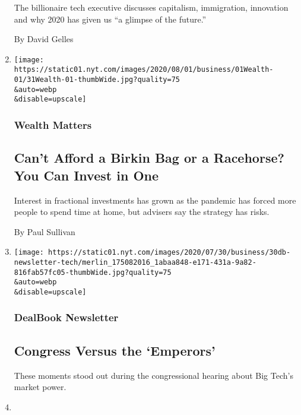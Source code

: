 \begin{enumerate}
  The billionaire tech executive discusses capitalism, immigration,
  innovation and why 2020 has given us ``a glimpse of the future.''

  By David Gelles
\item
  \href{/2020/07/31/your-money/birkin-bag-racehorse-invest.html}{}

  \texttt{[image: https://static01.nyt.com/images/2020/08/01/business/01Wealth-01/31Wealth-01-thumbWide.jpg?quality=75\\\&auto=webp\\\&disable=upscale]}

  \hypertarget{wealth-matters}{%
  \subsubsection{Wealth Matters}\label{wealth-matters}}

  \hypertarget{cant-afford-a-birkin-bag-or-a-racehorse-you-can-invest-in-one}{%
  \subsection{Can't Afford a Birkin Bag or a Racehorse? You Can Invest
  in
  One}\label{cant-afford-a-birkin-bag-or-a-racehorse-you-can-invest-in-one}}

  Interest in fractional investments has grown as the pandemic has
  forced more people to spend time at home, but advisers say the
  strategy has risks.

  By Paul Sullivan
\item
  \href{/2020/07/30/business/dealbook/tech-hearing-highlights.html}{}

  \texttt{[image: https://static01.nyt.com/images/2020/07/30/business/30db-newsletter-tech/merlin\_175082016\_1abaa848-e171-431a-9a82-816fab57fc05-thumbWide.jpg?quality=75\\\&auto=webp\\\&disable=upscale]}

  \hypertarget{dealbook-newsletter-2}{%
  \subsubsection{DealBook Newsletter}\label{dealbook-newsletter-2}}

  \hypertarget{congress-versus-the-emperors}{%
  \subsection{Congress Versus the
  `Emperors'}\label{congress-versus-the-emperors}}

  These moments stood out during the congressional hearing about Big
  Tech's market power.
\item
  \href{/2020/07/30/technology/europe-new-phase-tech-amazon-apple-facebook-google.html}{}


\end{enumerate}
